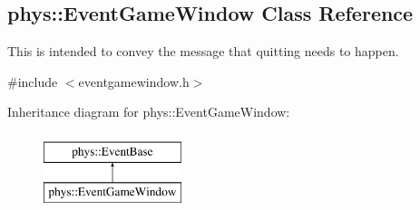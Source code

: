 \hypertarget{classphys_1_1EventGameWindow}{
\subsection{phys::EventGameWindow Class Reference}
\label{d4/d0f/classphys_1_1EventGameWindow}
}


This is intended to convey the message that quitting needs to happen.  




{\ttfamily \#include $<$eventgamewindow.h$>$}

Inheritance diagram for phys::EventGameWindow:\begin{figure}[H]
\begin{center}
\leavevmode
\includegraphics[height=2.000000cm]{d4/d0f/classphys_1_1EventGameWindow}
\end{center}
\end{figure}
